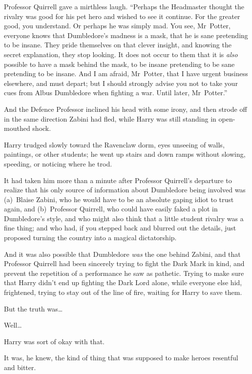 Professor Quirrell gave a mirthless laugh. “Perhaps the Headmaster thought the
rivalry was good for his pet hero and wished to see it continue. For the
greater good, you understand. Or perhaps he was simply mad. You see,
Mr~Potter, everyone knows that Dumbledore’s madness is a mask, that he is sane
pretending to be insane. They pride themselves on that clever insight, and
knowing the secret explanation, they stop looking. It does not occur to them
that it is \emph{also} possible to have a mask behind the mask, to be insane
pretending to be sane pretending to be insane. And I am afraid, Mr~Potter,
that I have urgent business elsewhere, and must depart; but I should strongly
advise you not to take your cues from Albus Dumbledore when fighting a war.
Until later, Mr~Potter.”

And the Defence Professor inclined his head with some irony, and then strode
off in the same direction Zabini had fled, while Harry was still standing in
open-mouthed shock.

Harry trudged slowly toward the Ravenclaw dorm, eyes unseeing of walls,
paintings, or other students; he went up stairs and down ramps without slowing,
speeding, or noticing where he trod.

It had taken him more than a minute after Professor Quirrell’s departure to
realize that his only source of information about Dumbledore being involved was
(a)~Blaise Zabini, who he would have to be an absolute gaping idiot to trust
again, and (b)~Professor Quirrell, who could have easily faked a plot in
Dumbledore’s style, and who might also think that a little student rivalry was
a fine thing; and who had, if you stepped back and blurred out the details,
just proposed turning the country into a magical dictatorship.

And it was also possible that Dumbledore \emph{was} the one behind Zabini, and
that Professor Quirrell had been sincerely trying to fight the Dark Mark in
kind, and prevent the repetition of a performance he saw as pathetic. Trying to
make sure that Harry didn’t end up fighting the Dark Lord alone, while everyone
else hid, frightened, trying to stay out of the line of fire, waiting for Harry
to save them.

But the truth was…

Well…

Harry was sort of okay with that.

It was, he knew, the kind of thing that was supposed to make heroes resentful
and bitter.

